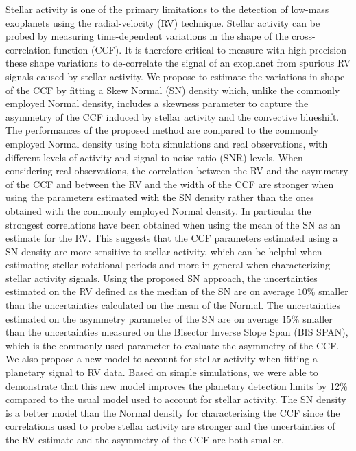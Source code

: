 \documentclass{aa}
\begin{document}
%
{Stellar activity is one of the primary limitations to the detection of low-mass exoplanets using the radial-velocity (RV) technique. 
Stellar activity can be probed by measuring time-dependent variations in the shape of the cross-correlation function (CCF). It is therefore 
critical to measure with high-precision these shape variations to de-correlate the signal of an exoplanet from spurious RV signals caused 
by stellar activity.}
%
{We propose to estimate the variations in shape of the CCF by fitting a Skew Normal (SN) density which, unlike the commonly employed Normal density, includes a skewness parameter to capture the asymmetry of the CCF induced by stellar activity and the convective blueshift.
}
%
{The performances of the proposed method are compared to the commonly employed Normal density using both simulations and real observations, with different levels of activity and signal-to-noise ratio (SNR) levels.}
%
{When considering real observations, the correlation between the RV and the asymmetry of the CCF and between the RV and the width of the CCF are stronger when using the parameters estimated with the SN density rather than the ones obtained with the commonly employed Normal density. 
In particular the strongest correlations have been obtained when using the mean of the SN as an estimate for the RV. 
This suggests that the CCF parameters estimated using a SN density are more sensitive to stellar activity, which can be helpful 
when estimating stellar rotational periods and more in general when characterizing stellar activity signals.
Using the proposed SN approach, the uncertainties estimated on the RV defined as the median of the SN are on average $10\%$ smaller than the uncertainties calculated on the mean of the Normal. 
The uncertainties estimated on the asymmetry parameter of the SN are on average $15\%$ smaller than the uncertainties measured on the Bisector Inverse Slope Span (BIS SPAN), which is the commonly used parameter to evaluate the asymmetry of the CCF. 
We also propose a new model to account for stellar activity when fitting a planetary signal to RV data.
Based on simple simulations, we were able to demonstrate that this new model improves the planetary detection limits by 12\% 
compared to the usual model used to account for stellar activity.
}
%
{The SN density is a better model than the Normal density for characterizing the CCF since the correlations used to probe stellar activity are stronger and the uncertainties of the RV estimate and the asymmetry of the CCF are both smaller.
}
\end{document}

